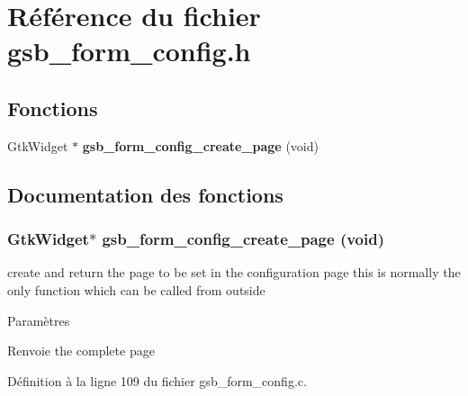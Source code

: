 \section{Référence du fichier gsb\_\-form\_\-config.h}
\label{gsb__form__config_8h}
\subsection*{Fonctions}
\begin{DoxyCompactItemize}
\item 
GtkWidget $\ast$ {\bf gsb\_\-form\_\-config\_\-create\_\-page} (void)
\end{DoxyCompactItemize}


\subsection{Documentation des fonctions}
\subsubsection[{gsb\_\-form\_\-config\_\-create\_\-page}]{\setlength{\rightskip}{0pt plus 5cm}GtkWidget$\ast$ gsb\_\-form\_\-config\_\-create\_\-page (void)}\label{gsb__form__config_8h_a18d33ebc2a3da624ca405227c6db0a4f}
create and return the page to be set in the configuration page this is normally the only function which can be called from outside


\begin{DoxyParams}{Paramètres}
\item[{\em }]\end{DoxyParams}
\begin{DoxyReturn}{Renvoie}
the complete page 
\end{DoxyReturn}


Définition à la ligne 109 du fichier gsb\_\-form\_\-config.c.

